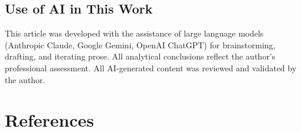 \documentclass[
  11pt,
  letterpaper,
]{article}
\begin{document}
\newpage

\subsection*{Use of AI in This Work}\label{use-of-ai-in-this-work}

This article was developed with the assistance of large language models
(Anthropic Claude, Google Gemini, OpenAI ChatGPT) for brainstorming,
drafting, and iterating prose. All analytical conclusions reflect the
author's professional assessment. All AI-generated content was reviewed
and validated by the author.

\section*{References}\label{references}
\end{document}
